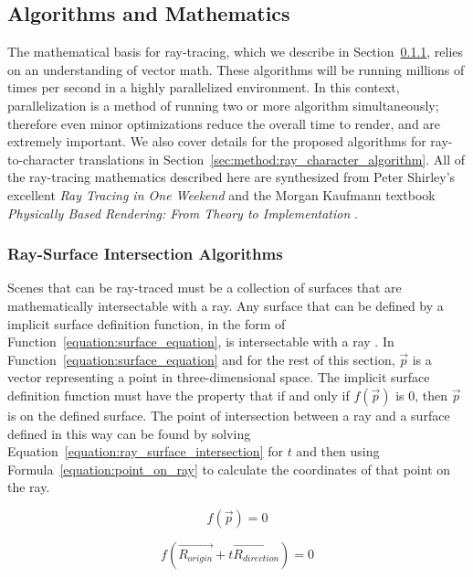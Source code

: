 \documentclass[11pt]{article}
\newcommand{\rayorg}{\vec{R_{origin}}}
\newcommand{\raydir}{\vec{R_{direction}}}
\begin{document}
\subsection{Algorithms and Mathematics}
\label{sec:method:algorithms}
The mathematical basis for ray-tracing, which we describe in Section~\ref{sec:method:ray_surface_intersection_algorithms}, relies on an understanding of vector math.
These algorithms will be running millions of times per second in a highly parallelized environment.
In this context, parallelization is a method of running two or more algorithm simultaneously; therefore even minor optimizations reduce the overall time to render, and are extremely important.
We also cover details for the proposed algorithms for ray-to-character translations in Section~\ref{sec:method:ray_character_algorithm}.
All of the ray-tracing mathematics described here are synthesized from Peter Shirley's excellent {\it Ray Tracing in One Weekend} \cite{shirley2016ray} and the Morgan Kaufmann textbook {\it Physically Based Rendering: From Theory to Implementation} \cite{pharr2016physically}.

\subsubsection{Ray-Surface Intersection Algorithms}
\label{sec:method:ray_surface_intersection_algorithms}
Scenes that can be ray-traced must be a collection of surfaces that are mathematically intersectable with a ray.
Any surface that can be defined by a implicit surface definition function, in the form of Function~\ref{equation:surface_equation}, is intersectable with a ray \cite{pharr2016physically}.
In Function~\ref{equation:surface_equation} and for the rest of this section, $\vec{p}$ is a vector representing a point in three-dimensional space.
The implicit surface definition function must have the property that if and only if $f(\vec{p})$ is $0$, then $\vec{p}$ is on the defined surface.
The point of intersection between a ray and a surface defined in this way can be found by solving Equation~\ref{equation:ray_surface_intersection} for $t$ and then using Formula~\ref{equation:point_on_ray} to calculate the coordinates of that point on the ray.

\begin{equation}
  \label{equation:surface_equation}
  f(\vec{p}) = 0
\end{equation}

\begin{equation}
  \label{equation:ray_surface_intersection}
  f(\rayorg + t\raydir) = 0
\end{equation}
\end{document}

